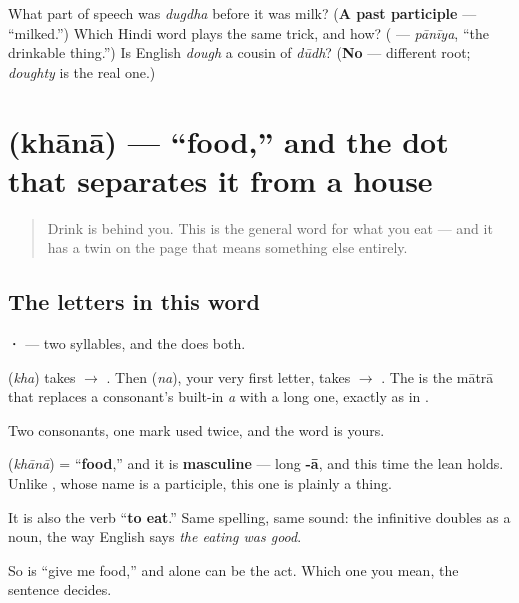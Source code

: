 \begin{tcolorbox}[breakable,colback=teal!4,colframe=teal!35!black,title={Before you move on}]
What part of speech was \emph{dugdha} before it was milk? (\textbf{A past participle} — \textquotedblleft{}milked.\textquotedblright{}) Which Hindi word plays the same trick, and how? (\textbf{} — \emph{pānīya}, \textquotedblleft{}the drinkable thing.\textquotedblright{}) Is English \emph{dough} a cousin of \emph{dūdh}? (\textbf{No} — different root; \emph{doughty} is the real one.)
\end{tcolorbox}
\section[\texorpdfstring{\hi{खाना} / \hi{ख़ाना} (khānā / khāna)}{खाना / ख़ाना (khānā / khāna)}]{ (khānā) — \textquotedblleft{}food,\textquotedblright{} and the dot that separates it from a house}

\label{lesson:HI-C37-khaana}



\begin{quote}
Drink is behind you. This is the general word for what you eat — and it has a twin on the page that means something else entirely.
\end{quote}

\subsection*{The letters in this word}
\textbf{·} — two syllables, and the \textbf{} does both.

\textbf{} (\emph{kha}) takes \textbf{} $\to$ \textbf{}. Then \textbf{} (\emph{na}), your very first letter, takes \textbf{} $\to$ \textbf{}. The \textbf{} is the mātrā that replaces a consonant's built-in \emph{a} with a long one, exactly as in \textbf{}.

Two consonants, one mark used twice, and the word is yours.

\begin{grammarlens}[title={Grammar Lens: one word doing two jobs}]
\textbf{} (\emph{khānā}) = \textquotedblleft{}\textbf{food},\textquotedblright{} and it is \textbf{masculine} — long \textbf{-ā}, and this time the lean holds. Unlike \textbf{}, whose name is a participle, this one is plainly a thing.

It is also the verb \textquotedblleft{}\textbf{to eat}.\textquotedblright{} Same spelling, same sound: the infinitive doubles as a noun, the way English says \emph{the eating was good}.

So \textbf{ } is \textquotedblleft{}give me food,\textquotedblright{} and \textbf{} alone can be the act. Which one you mean, the sentence decides.
\end{grammarlens}

